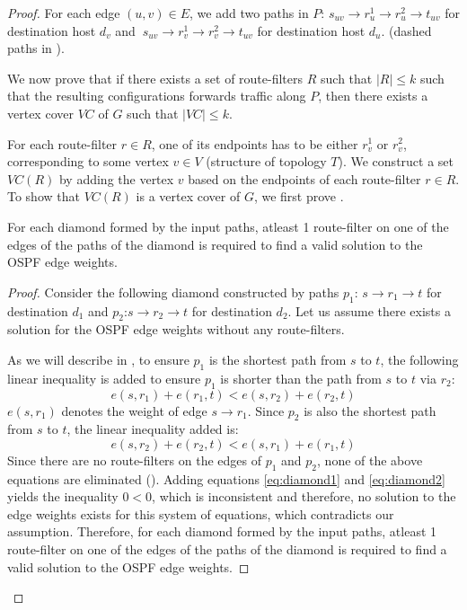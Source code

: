 \begin{proof}
For each edge $(u,v) \in E$, we add two paths in $P$: 
$s_{uv} \rightarrow r_u^1 \rightarrow r_u^2 \rightarrow t_{uv}$
for destination host $d_v$ and 
$~s_{uv} \rightarrow r_v^1 \rightarrow r_v^2 \rightarrow t_{uv}$ 
for destination host $d_u$.
(dashed paths in ). 

We now prove that if there exists a set of route-filters
$R$ such that $|R| \leq k$ such that the resulting configurations
forwards traffic along $P$, then there exists a vertex cover $VC$
of $G$ such that $|VC| \leq k$. 

For each route-filter $r \in R$, one of its endpoints 
has to be either $r_v^1$ or $r_v^2$, corresponding
to some vertex $v \in V$ (structure of topology $T$). 
We construct a set $VC(R)$ by adding the vertex $v$ 
based on the endpoints of each route-filter $r \in R$.
To show that $VC(R)$ is a vertex cover of $G$, we first
prove .

\begin{lemma} \label{lemma:diamond}
	 For each diamond formed by the input paths, atleast 1 
	 route-filter on one of the edges of the paths of the diamond 
	 is required to find a valid solution to the
	 OSPF edge weights.  
\end{lemma}

\begin{proof}
Consider the following diamond %
constructed by paths $p_1$: $s \rightarrow r_1 \rightarrow t$ 
for destination $d_1$ and $p_2$:$s \rightarrow r_2 \rightarrow t$ 
for destination $d_2$. Let us assume there exists a solution 
for the OSPF edge weights without any route-filters. 

As we will describe in , 
to ensure $p_1$ is the shortest path from $s$ to $t$, the following
linear inequality is added to ensure $p_1$ is shorter than the
path from $s$ to $t$ via $r_2$: 
\begin{equation} \label{eq:diamond1}
	e(s,r_1) + e(r_1, t) < e(s, r_2) + e(r_2,t)
\end{equation}
$e(s,r_1)$ denotes the weight of edge $s \rightarrow r_1$.
Since $p_2$ is also the shortest path from $s$ 
to $t$, the linear inequality added is:
\begin{equation}  \label{eq:diamond2}
e(s,r_2) + e(r_2, t) < e(s, r_1) + e(r_1,t)
\end{equation}
Since there are no route-filters on the edges
of $p_1$ and $p_2$, none of the above equations are 
eliminated (). 
Adding equations \ref{eq:diamond1} and  \ref{eq:diamond2} 
yields the inequality $0 < 0$, which is inconsistent 
and therefore, no solution to 
the edge weights exists for this system of equations, 
which contradicts our assumption. Therefore,
for each diamond formed by the input paths, atleast 1 
route-filter on one of the edges of the paths of the diamond 
is required to find a valid solution to the
OSPF edge weights.  
\end{proof}


\end{proof}
